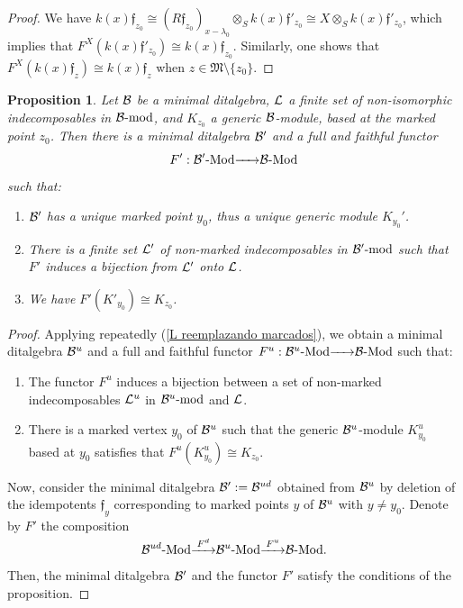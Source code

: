 \documentclass{article}
\newtheorem{proposition}[theorem]{Proposition}
\theoremstyle{definition}
\newcommand{\Mod}{{ \rm Mod }}
\renewcommand{\frak}{\mathfrak}
\newcommand{\g}{\hbox{-}}
\renewcommand{\mod}{{\rm mod }}
\newcommand{\rightmap}[1]{\smash{\mathop{\hbox to 
20pt{\rightarrowfill}}\limits^{#1}}}
\begin{document}
\begin{proof}
We have $k(x)\frak{f}_{z_0}\cong (R\frak{f}_{z_0})_{x-\lambda_0}\otimes_S k(x)\frak{f}'_{z_0}\cong X\otimes_Sk(x)\frak{f}'_{z_0}$, which implies that $F^X(k(x)\frak{f}'_{z_0})\cong k(x)\frak{f}_{z_0}$.   
Similarly, one shows that $F^X(k(x)\frak{f}_z)\cong k(x)\frak{f}_z$ when $z\in \frak{M}\setminus\{z_0\}$. 
\end{proof}

\begin{proposition}\label{P: ditalg min simplificada} Let ${\cal B}$ be a minimal ditalgebra, ${\cal L}$ a finite set of non-isomorphic indecomposables in ${\cal B}\g\mod$, and $K_{z_0}$ a generic ${\cal B}$-module, based at the marked point $z_0$. Then there is a minimal ditalgebra ${\cal B}'$ and a full and faithful functor  
$$F':{\cal B}'\g\Mod\rightmap{}{\cal B}\g\Mod$$
such that:
\begin{enumerate}
\item ${\cal B}'$ has a unique marked point $y_0$, thus a unique generic module $K_{y_0}'$. 
\item There is a finite set ${\cal L}'$ of non-marked  indecomposables in ${\cal B}'\g\mod$  such that $F'$ induces a bijection from ${\cal L}'$ onto ${\cal L}$.
\item We have $F'(K'_{y_0})\cong K_{z_0}$. 
\end{enumerate}
\end{proposition}

\begin{proof} Applying repeatedly (\ref{L reemplazando marcados}), we obtain a minimal ditalgebra ${\cal B}^u$ and a full and faithful functor $F^u:{\cal B}^u\g\Mod\rightmap{}{\cal B}\g\Mod$ such that: 
\begin{enumerate}
\item The functor $F^u$ induces a bijection between a set of non-marked indecomposables ${\cal L}^u$ in ${\cal B}^u\g\mod$ and ${\cal L}$. 
\item There is a marked vertex $y_0$ of ${\cal B}^u$ such that the generic ${\cal B}^u$-module $K_{y_0}^u$ based at $y_0$ satisfies that $F^u(K^{u}_{y_0})\cong K_{z_0}$.   
\end{enumerate}
Now, consider the minimal ditalgebra ${\cal B}':={\cal B}^{ud}$ obtained from ${\cal B}^u$ by deletion of the idempotents $\frak{f}_y$ corresponding to marked points $y$ of ${\cal B}^u$ with $y\not=y_0$. Denote by $F'$ the composition 
$${\cal B}^{ud}\g\Mod\rightmap{F^d}{\cal B}^u\g\Mod\rightmap{F^u}{\cal B}\g\Mod.$$
Then, the minimal ditalgebra ${\cal B}'$ and the functor $F'$ satisfy the conditions of the proposition. 
\end{proof}
\end{document}
